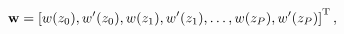 \[\mathbf{w}=\left[w(z_{0}),w^{\prime}(z_{0}),w(z_{1}),w^{\prime}(z_{1}),\dots,w%
(z_{P}),w^{\prime}(z_{P})\right]^{\rm T},\]